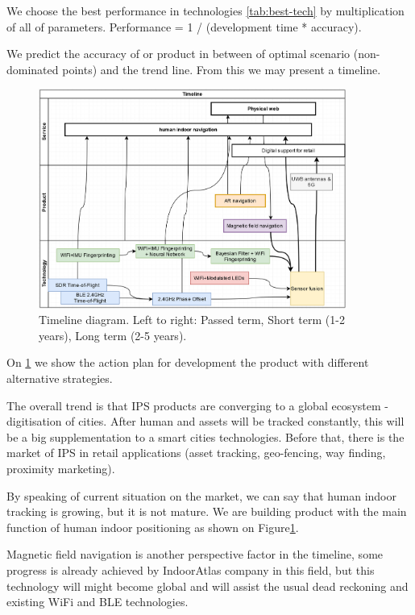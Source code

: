 We choose the best performance in technologies \ref{tab:best-tech} by multiplication of all of parameters.
Performance = 1 / (development time * accuracy).

We predict the accuracy of or product in between of optimal scenario (non-dominated points) and the trend line. From this we may present a timeline.

\begin{figure}[t]
    \centering
    \includegraphics[width=0.9\textwidth]{img/timeline.png}
    \caption{Timeline diagram. Left to right: Passed term, Short term (1-2 years), Long term (2-5 years).}
    \label{fig:timeline}
\end{figure}

On \ref{fig:timeline} we show the action plan for development the product with different alternative strategies.

The overall trend is that IPS products are converging to a global ecosystem - digitisation of cities. After human and assets will be tracked constantly, this will be a big supplementation to a smart cities technologies.
Before that, there is the market of IPS in retail applications (asset tracking, geo-fencing, way finding, proximity marketing).\cite{Infsoft_wp}

By speaking of current situation on the market, we can say that human indoor tracking is growing, but it is not mature.
We are building product with the main function of human indoor positioning as shown on Figure\ref{fig:timeline}.

Magnetic field navigation is another perspective factor in the timeline, some progress is already achieved by IndoorAtlas company in this field, but this technology will might become global and will assist the usual dead reckoning and existing WiFi and BLE technologies.

